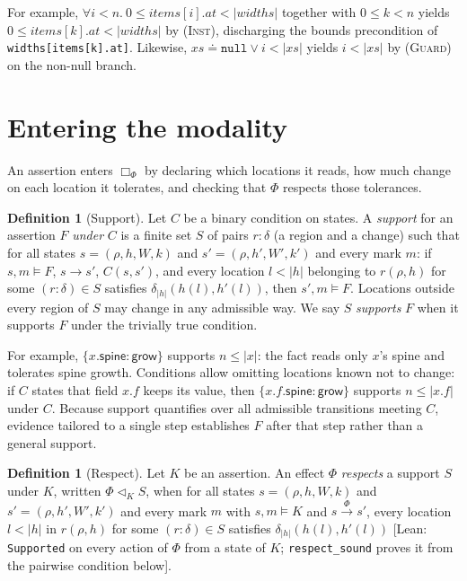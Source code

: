 \documentclass[10pt,a4paper]{article}
\theoremstyle{definition}
\newtheorem{definition}[theorem]{Definition}
\theoremstyle{remark}
\newcommand{\bx}[1]{\Box_{#1}}
\newcommand{\kw}[1]{\mathsf{#1}}
\newcommand{\grow}{\kw{grow}}
\newcommand{\len}[1]{|#1|}
\newcommand{\tr}[1]{\xrightarrow{#1}}
\newcommand{\resp}{\mathrel{\triangleleft}}
\newcommand{\code}[1]{\texttt{#1}}
\newcommand{\lean}[1]{\texttt{\small #1}}
\newcommand{\status}[1]{\textsf{\small[#1]}}
\begin{document}
\noindent
For example, $\forall i<n.\ 0\le\mathit{items}[i].\mathit{at}<\len{\mathit{widths}}$
together with $0\le k<n$ yields
$0\le\mathit{items}[k].\mathit{at}<\len{\mathit{widths}}$ by
\textsc{(Inst)}, discharging the bounds precondition of
\code{widths[items[k].at]}. Likewise,
$\mathit{xs}\doteq\code{null}\vee i<\len{\mathit{xs}}$ yields
$i<\len{\mathit{xs}}$ by \textsc{(Guard)} on the non-null branch.

\section{Entering the modality}\label{sec:modality}

An assertion enters $\bx{\Phi}$ by declaring which locations it reads,
how much change on each location it tolerates, and checking that $\Phi$
respects those tolerances.

\begin{definition}[Support]\label{def:support}
Let $C$ be a binary condition on states. A \emph{support} for an assertion
$F$ \emph{under} $C$ is a finite set $S$ of pairs $r:\delta$ (a region
and a change) such that for all states $s=(\rho,h,W,k)$ and
$s'=(\rho,h',W',k')$ and every mark $m$: if $s,m\models F$, $s\tr{} s'$,
$C(s,s')$, and every location $l<\len h$ belonging to $r(\rho,h)$ for some
$(r:\delta)\in S$ satisfies $\delta_{\len h}(h(l),h'(l))$, then
$s',m\models F$. Locations outside every region of $S$ may change in any
admissible way. We say $S$ \emph{supports} $F$ when it supports $F$ under
the trivially true condition.
\end{definition}

\noindent
For example, $\{x.\kw{spine}:\grow\}$ supports $n\le\len x$: the fact
reads only $x$'s spine and tolerates spine growth. Conditions allow
omitting locations known not to change: if $C$ states that field $x.f$
keeps its value, then $\{x.f.\kw{spine}:\grow\}$ supports
$n\le\len{x.f}$ under $C$. Because support quantifies over all admissible
transitions meeting $C$, evidence tailored to a single step establishes
$F$ after that step rather than a general support.

\begin{definition}[Respect]\label{def:respect}
Let $K$ be an assertion. An effect $\Phi$ \emph{respects} a support $S$
under $K$, written $\Phi\resp_K S$, when for all states
$s=(\rho,h,W,k)$ and $s'=(\rho,h',W',k')$ and every mark $m$ with
$s,m\models K$ and $s\tr{\Phi} s'$, every location $l<\len h$
in $r(\rho,h)$ for some $(r:\delta)\in S$ satisfies
$\delta_{\len h}(h(l),h'(l))$
\status{Lean: \lean{Supported} on every action of $\Phi$ from a state of $K$; \lean{respect\_sound} proves it from the pairwise condition below}.
\end{definition}
\end{document}

